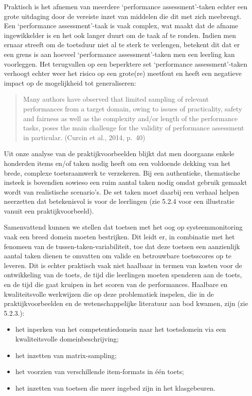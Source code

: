 \documentclass[
  letterpaper,
]{report}
\providecommand{\tightlist}{%
  \setlength{\itemsep}{0pt}\setlength{\parskip}{0pt}}
\begin{document}
Praktisch is het afnemen van meerdere `performance assessment'-taken
echter een grote uitdaging door de vereiste inzet van middelen die dit
met zich meebrengt. Een `performance assessment'-taak is vaak complex,
wat maakt dat de afname ingewikkelder is en het ook langer duurt om de
taak af te ronden. Indien men ernaar streeft om de toetsduur niet al te
sterk te verlengen, betekent dit dat er een grens is aan hoeveel
`performance assessment'-taken men een leerling kan voorleggen. Het
terugvallen op een beperktere set `performance assessment'-taken
verhoogt echter weer het risico op een grote(re) meetfout en heeft een
negatieve impact op de mogelijkheid tot generaliseren:

\begin{quote}
Many authors have observed that limited sampling of relevant
performances from a target domain, owing to issues of practicality,
safety and fairness as well as the complexity and/or length of the
performance tasks, poses the main challenge for the validity of
performance assessment in particular. (Curcin et al., 2014, p.~40)
\end{quote}

Uit onze analyse van de praktijkvoorbeelden blijkt dat men doorgaans
enkele honderden items en/of taken nodig heeft om een voldoende dekking
van het brede, complexe toetsraamwerk te verzekeren. Bij een
authentieke, thematische insteek is bovendien sowieso een ruim aantal
taken nodig omdat gebruik gemaakt wordt van realistische scenario's. De
set taken moet daarbij een verhaal helpen neerzetten dat betekenisvol is
voor de leerlingen (zie 5.2.4 voor een illustratie vanuit een
praktijkvoorbeeld).

Samenvattend kunnen we stellen dat toetsen met het oog op
systeemmonitoring vaak een breed domein moeten bestrijken. Dit leidt er,
in combinatie met het fenomeen van de tussen-taken-variabiliteit, toe
dat deze toetsen een aanzienlijk aantal taken dienen te omvatten om
valide en betrouwbare toetsscores op te leveren. Dit is echter praktisch
vaak niet haalbaar in termen van kosten voor de ontwikkeling van de
toets, de tijd die leerlingen moeten spenderen aan de toets, en de tijd
die gaat kruipen in het scoren van de performances. Haalbare en
kwaliteitsvolle werkwijzen die op deze problematiek inspelen, die in de
praktijkvoorbeelden en de wetenschappelijke literatuur aan bod kwamen,
zijn (zie 5.2.3.):

\begin{itemize}
\tightlist
\item
  het inperken van het competentiedomein naar het toetsdomein via een
  kwaliteitsvolle domeinbeschrijving;
\item
  het inzetten van matrix-sampling;
\item
  het voorzien van verschillende item-formats in één toets;
\item
  het inzetten van toetsen die meer ingebed zijn in het klasgebeuren.
\end{itemize}
\end{document}
